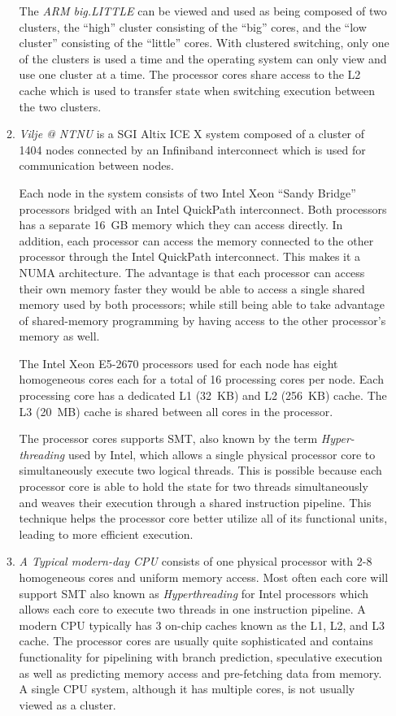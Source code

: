 \begin{enumerate}
\begin{enumerate}
The \textit{ARM big.LITTLE} can be viewed and used as being composed of two clusters, the ``high'' cluster consisting of the ``big'' cores, and the ``low cluster'' consisting of the ``little'' cores. With clustered switching, only one of the clusters is used a time and the operating system can only view and use one cluster at a time. The processor cores share access to the L2 cache which is used to transfer state when switching execution between the two clusters.

\item \textit{Vilje @ NTNU} is a \ac{SGI} Altix ICE X system composed of a cluster of 1404 nodes connected by an Infiniband interconnect which is used for communication between nodes.

Each node in the system consists of two Intel Xeon ``Sandy Bridge'' processors bridged with an Intel QuickPath interconnect. Both processors has a separate 16~GB memory which they can access directly. In addition, each processor can access the memory connected to the other processor through the Intel QuickPath interconnect. This makes it a \ac{NUMA} architecture. The advantage is that each processor can access their own memory faster they would be able to access a single shared memory used by both processors; while still being able to take advantage of shared-memory programming by having access to the other processor's memory as well.

The Intel Xeon E5-2670 processors used for each node has eight homogeneous cores each for a total of 16 processing cores per node. Each processing core has a dedicated L1 (32~KB) and L2 (256~KB) cache. The L3 (20~MB) cache is shared between all cores in the processor.

The processor cores supports \ac{SMT}, also known by the term \textit{Hyper-threading} used by Intel, which allows a single physical processor core to simultaneously execute two logical threads. This is possible because each processor core is able to hold the state for two threads simultaneously and weaves their execution through a shared instruction pipeline. This technique helps the processor core better utilize all of its functional units, leading to more efficient execution.

\item \textit{A Typical modern-day \ac{CPU}} consists of one physical processor with 2-8 homogeneous cores and uniform memory access. Most often each core will support \ac{SMT} also known as \textit{Hyperthreading} for Intel processors which allows each core to execute two threads in one instruction pipeline. A modern \ac{CPU} typically has 3 on-chip caches known as the L1, L2, and L3 cache. The processor cores are usually quite sophisticated and contains functionality for pipelining with branch prediction, speculative execution as well as predicting memory access and pre-fetching data from memory. A single \ac{CPU} system, although it has multiple cores, is not usually viewed as a cluster.


\end{enumerate}
\end{enumerate}
